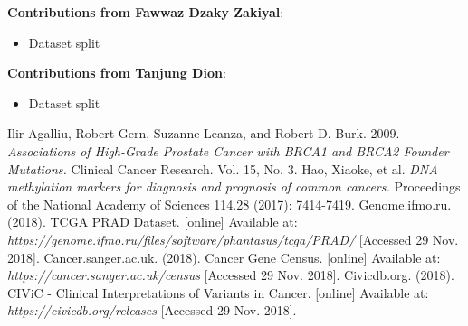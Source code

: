 \documentclass[a4paper,oneside]{article}
\begin{document}
\textbf{Contributions from Fawwaz Dzaky Zakiyal}:
\begin{itemize}
\item Dataset split
\end{itemize}

\textbf{Contributions from Tanjung Dion}:
\begin{itemize}
\item Dataset split
\end{itemize}

\begin{thebibliography}{1}
 Ilir Agalliu, Robert Gern, Suzanne Leanza, and Robert D. Burk. 2009. {\em Associations of High-Grade Prostate Cancer with BRCA1 and BRCA2 Founder Mutations.} Clinical Cancer Research. Vol. 15, No. 3.
 Hao, Xiaoke, et al. {\em DNA methylation markers for diagnosis and prognosis of common cancers.} Proceedings of the National Academy of Sciences 114.28 (2017): 7414-7419.
 Genome.ifmo.ru. (2018). TCGA PRAD Dataset. [online] Available at: {\em https://genome.ifmo.ru/files/software/phantasus/tcga/PRAD/ } [Accessed 29 Nov. 2018].
 Cancer.sanger.ac.uk. (2018). Cancer Gene Census. [online] Available at: {\em https://cancer.sanger.ac.uk/census } [Accessed 29 Nov. 2018].
 Civicdb.org. (2018). CIViC - Clinical Interpretations of Variants in Cancer. [online] Available at: {\em https://civicdb.org/releases } [Accessed 29 Nov. 2018].
\end{thebibliography}
\end{document}
